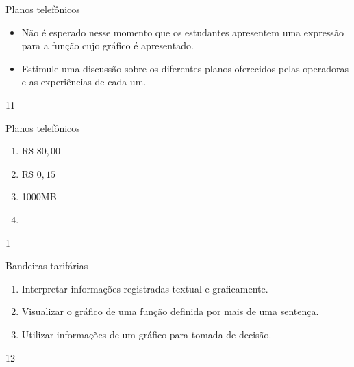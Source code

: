 \begin{sugestions}{Planos telefônicos}
{
\begin{itemize}
\item Não é esperado nesse momento que os estudantes apresentem uma expressão para a função cujo gráfico é apresentado.

\item Estimule uma discussão sobre os diferentes planos oferecidos pelas operadoras e as experiências de cada um.
\end{itemize}
}{1}{1}
\end{sugestions}
\begin{answer}{Planos telefônicos}
{
\begin{enumerate}
\item R\$ $80{,}00$
\item R\$ $0{,}15$
\item 1000MB
\item{}
\end{enumerate}
}{1}
\end{answer}
\clearmargin
\begin{objectives}{Bandeiras tarifárias}
{
\begin{enumerate}

\item Interpretar informações registradas textual e graficamente.

\item  Visualizar o gráfico de uma função definida por mais de uma sentença.

\item Utilizar informações de um gráfico para tomada de decisão.

\end{enumerate}
}{1}{2}
\end{objectives}
